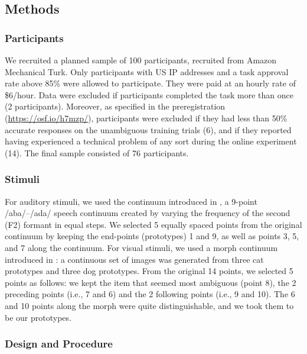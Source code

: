 \documentclass[10pt,letterpaper]{article}
\begin{document}
\subsection{Methods}

\subsubsection{Participants}

We recruited a planned sample of 100 participants, recruited from Amazon Mechanical Turk. Only participants with US IP addresses and a task approval rate above 85\% were allowed to participate. They were paid at an hourly rate of \$6/hour. Data were excluded if participants completed the task more than
once (2 participants). Moreover, as specified in the preregistration (\url{https://osf.io/h7mzp/}), participants were excluded if they had less than 50\% accurate responses on the unambiguous training trials (6), and if they reported having experienced a technical problem of any sort during the online experiment (14). The final sample consisted of 76 participants.

\subsubsection{Stimuli}

For  auditory stimuli, we used the continuum introduced in , a 9-point /aba/--/ada/ speech continuum created by varying the frequency of the second (F2) formant in equal steps. We selected 5 equally spaced points from the original continuum by keeping the end-points (prototypes) 1 and 9, as well as points 3, 5, and 7 along the continuum. For visual stimuli, we used a morph continuum introduced in : a continuous set of images was generated from three cat prototypes and three dog prototypes. From the original 14 points, we selected 5 points as follows: we kept the item that seemed most ambiguous (point 8), the 2 preceding points (i.e., 7 and 6) and the 2 following points (i.e., 9 and 10). The 6 and 10 points along the morph were quite distinguishable, and we took them to be our prototypes.
%

\subsubsection{Design and Procedure}
\end{document}
